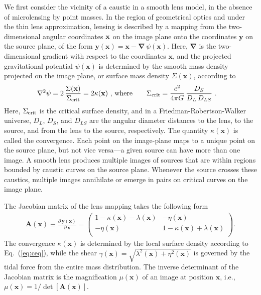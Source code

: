 \documentclass{aastex6}
\newcommand{\bt}[1]{\mathbf #1}
\newcommand{\refeq}[1]{Eq.~(\ref{eq:#1})}
\newcommand{\ba}{\begin{eqnarray}}
\newcommand{\ea}{\end{eqnarray}}
\begin{document}
We first consider the vicinity of a caustic in a smooth lens model, in the absence of microlensing by point masses. In the region of geometrical optics and under the thin lens approximation, lensing is described by a mapping from the two-dimensional angular coordinates $\bf x$ on the image plane onto  the coordinates $\bt y$ on the source plane, of the form $\bt y(\bt x) = \bt x - \bm\nabla \,\psi(\bt x)$. Here, $\bm\nabla$ is the two-dimensional gradient with respect to the coordinates $\bt x$, and the projected gravitational potential $\psi(\bt x)$ is determined by the smooth mass density projected on the image plane, or surface mass density $\Sigma(\bt x)$, according to 
\citep[e.g.,][]{1986ApJ...310..568B}
\begin{align}
\label{eq:ceq}
 \nabla^2 \psi &= 2\, \frac{\Sigma(\bt x)}{\Sigma_{\rm crit}} =
 2 \kappa(\bt x) ~, \, {\rm where} \qquad
 \Sigma_{\rm crit} = \frac{c^2}{4\pi G}\, \frac{D_S}{D_L\, D_{LS}} ~.
\end{align}
Here, $\Sigma_{\rm crit}$ is the critical surface density, and in a Friedman-Robertson-Walker universe, $D_L$, $D_S$, and  $D_{LS}$ are the angular diameter distances to the lens, to the source, and from the lens to the source, respectively. The quantity $\kappa(\bt x)$ is called the convergence. Each point on the image-plane maps to a unique point on the source plane, but not vice versa---a given source can have more than one image. A smooth lens produces multiple images of sources that are within regions bounded by caustic curves on the source plane. Whenever the source crosses these caustics, multiple images annihilate or emerge in pairs on critical curves on the image plane.

The Jacobian matrix of the lens mapping takes the following form
\ba
\bt A(\bt x) \equiv
\frac{\partial\,\bt y(\bt x)}{\partial\,\bt x} =
\left( \begin{array}{cc}
1-\kappa(\bt x)-\lambda(\bt x) & -\eta(\bt x) \\
-\eta(\bt x) & 1-\kappa(\bt x)+\lambda(\bt x) \\
\end{array} \right).
\label{eq:magmatrix}
\ea
The convergence $\kappa(\bt x)$ is determined by the local surface density according to \refeq{ceq}, while the shear $\gamma(\bt x) = \sqrt{\lambda^2(\bt x) + \eta^2(\bt x)}$ is governed by the tidal force from the entire mass distribution. The inverse determinant of the Jacobian matrix is the magnification $\mu(\bt x)$ of an image at position $\bt x$, i.e., $\mu(\bt x) = 1/\det[\bt A(\bt x)]$.
\end{document}
